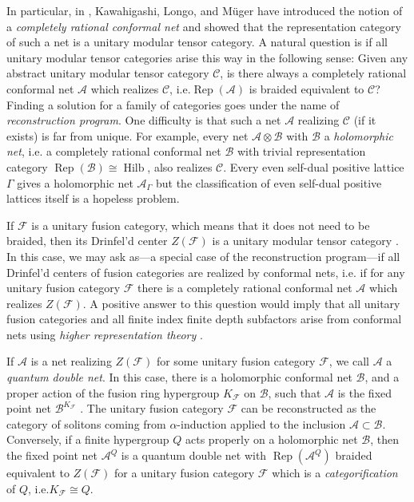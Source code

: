 \documentclass[twoside,11pt,reqno]{amsart}
\makeatletter
\theoremstyle{definition}
\theoremstyle{remark}
\newcommand{\cF}{\mathcal{F}}
\newcommand{\cB}{\mathcal{B}}
\newcommand{\cC}{\mathcal{C}}
\newcommand{\A}{\mathcal{A}}
\DeclareMathOperator{\Rep}{Rep}
\DeclareRobustCommand{\ie}{i.e.\@\xspace}
\DeclareMathOperator*{\Hilb}{Hilb}
\newcommand{\myemph}[1]{\emph{#1}}
\makeatother
\begin{document}
In particular, in \cite{KaLoMg2001}, Kawahigashi, Longo, and Müger have 
introduced the notion of a 
\myemph{completely rational conformal net} and showed that the 
representation category of such a net is a unitary modular tensor category. 
A natural question is if all unitary modular tensor categories arise this way
in the following sense: 
Given any abstract unitary modular tensor category $\cC$,
is there always a completely rational conformal net $\A$ which realizes $\cC$, 
\ie $\Rep(\A)$ is braided equivalent to $\cC$?
Finding a solution for a family of categories goes under the
name of \emph{reconstruction program}.
One difficulty is that such a net $\A$ realizing $\cC$ (if it exists) is far 
from unique.
For example, every net $\A\otimes \cB$ with $\cB$ a \myemph{holomorphic net},
\ie a completely rational conformal net $\cB$ with trivial representation 
category $\Rep(\cB)\cong \Hilb$, also realizes $\cC$.
Every even self-dual positive lattice $\Gamma$ gives a holomorphic net 
$\A_\Gamma$
but the classification of even self-dual positive lattices itself is a hopeless
problem.


If $\cF$ is a unitary fusion category, 
which means that it does not need to be braided, 
then its Drinfel'd center $Z(\cF)$ is a 
unitary modular tensor category \cite{Mg2003II}.
In this case, we may ask as---a special case of the reconstruction program---if 
all Drinfel'd centers of fusion categories are realized by conformal nets,
\ie if for any unitary fusion category $\cF$ there is a 
completely rational conformal net $\A$ which realizes $Z(\cF)$.
A positive answer to this question would imply that all 
unitary fusion categories and all finite index finite depth subfactors arise 
from conformal nets using \emph{higher representation theory}
%
\cite{Bi2015,Bi2015VFR}.

If $\A$ is a net realizing $Z(\cF)$ for some unitary fusion category $\cF$, 
we call $\A$ a \myemph{quantum double net}.
In this case, there is a holomorphic conformal net $\cB$, 
and a proper action of the fusion ring hypergroup $K_\cF$ on $\cB$,
such that $\A$ is the fixed point net $\cB^{K_\cF}$ \cite{Bi2016}. 
The unitary fusion category $\cF$ can be reconstructed as the category of 
solitons coming from $\alpha$-induction applied to the inclusion 
$\A\subset \cB$. 
Conversely, if a finite hypergroup $Q$ acts properly on a holomorphic net $\cB$,
then the fixed point net $\A^Q$ is a quantum double net with $\Rep(\A^Q)$ 
braided equivalent to $Z(\cF)$ for a unitary fusion category $\cF$ which is a 
\myemph{categorification} of $Q$, \ie $K_\cF\cong Q$.
\end{document}
